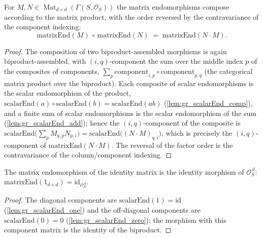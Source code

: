\begin{lemma}
  \label{lem:gr_matrixEnd_comp}
  For \(M, N \in \operatorname{Mat}_{d \times d}(\Gamma(S, \mathcal{O}_S))\) the matrix
  endomorphisms compose according to the matrix product, with the order reversed by
  the contravariance of the component indexing:
  \[
    \mathrm{matrixEnd}(M) \,\circ\, \mathrm{matrixEnd}(N)
      \;=\; \mathrm{matrixEnd}(N \cdot M).
  \]
\end{lemma}
\begin{proof}
  The composition of two biproduct-assembled morphisms is again biproduct-assembled,
  with \((i,q)\)-component the sum over the middle index \(p\) of the composites of
  components, \(\sum_p \mathrm{component}_{i,p} \circ \mathrm{component}_{p,q}\) (the
  categorical matrix product over the biproduct). Each composite of scalar
  endomorphisms is the scalar endomorphism of the product,
  \(\mathrm{scalarEnd}(a)\circ\mathrm{scalarEnd}(b) = \mathrm{scalarEnd}(ab)\)
  (\cref{lem:gr_scalarEnd_comp}), and a finite sum of scalar endomorphisms is the
  scalar endomorphism of the sum (\cref{lem:gr_scalarEnd_add}); hence the \((i,q)\)-component
  of the composite is \(\mathrm{scalarEnd}\bigl(\sum_p M_{q,p} N_{p,i}\bigr) =
  \mathrm{scalarEnd}\bigl((N\cdot M)_{q,i}\bigr)\), which is precisely the
  \((i,q)\)-component of \(\mathrm{matrixEnd}(N\cdot M)\). The reversal of the factor
  order is the contravariance of the column/component indexing.
\end{proof}

\begin{lemma}
  \label{lem:gr_matrixEnd_one}
  The matrix endomorphism of the identity matrix is the identity morphism of
  \(\mathcal{O}_S^{\,d}\): \(\mathrm{matrixEnd}(1_{d\times d}) =
  \mathrm{id}_{\mathcal{O}_S^{\,d}}\).
\end{lemma}
\begin{proof}
  The diagonal components are \(\mathrm{scalarEnd}(1) = \mathrm{id}\)
  (\cref{lem:gr_scalarEnd_one}) and the off-diagonal components are
  \(\mathrm{scalarEnd}(0) = 0\) (\cref{lem:gr_scalarEnd_zero}); the morphism with this
  component matrix is the identity of the biproduct.
\end{proof}

